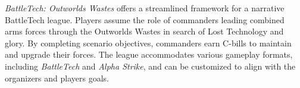 \emph{BattleTech: Outworlds Wastes} offers a streamlined framework for a narrative BattleTech league. 
Players assume the role of commanders leading combined arms forces through the Outworlds Wastes in search of Lost Technology and glory. 
By completing scenario objectives, commanders earn C-bills to maintain and upgrade their forces. 
The league accommodates various gameplay formats, including \emph{BattleTech} and \emph{Alpha Strike}, and can be customized to align with the organizers and players goals.
